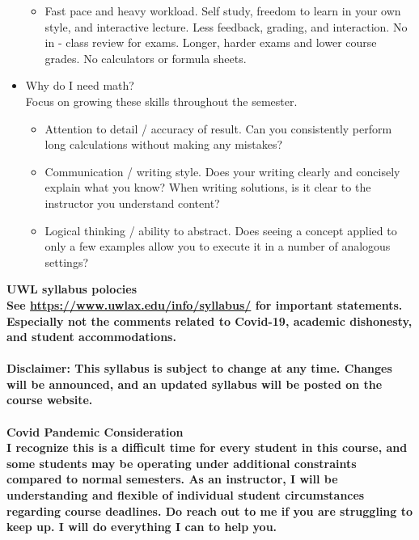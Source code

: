 \documentclass [11pt]{article}
\begin{document}
\begin{itemize}
\begin{itemize}
\setlength{\itemsep}{1pt}
\setlength{\parskip}{0pt}
\setlength{\parsep}{0pt}
\item Fast pace and heavy workload. Self study, freedom to learn in your own style, and interactive lecture. Less feedback, grading, and interaction. No in - class review for exams. Longer, harder exams and lower course grades. No calculators or formula sheets.
\end{itemize}
\item Why do I need math? \\ 
Focus on growing these skills throughout the semester.
\begin {itemize}
\setlength{\itemsep}{1pt}
\setlength{\parskip}{0pt}
\setlength{\parsep}{0pt}
\item Attention to detail / accuracy of result. Can you consistently perform long calculations without making any mistakes?
\item Communication / writing style. Does your writing clearly and concisely explain what you know? When writing solutions, is it clear to the instructor you understand content?
\item Logical thinking / ability to abstract. Does seeing a concept applied to only a few examples allow you to execute it in a number of analogous settings?
\end{itemize}
\end{itemize}
\bfseries UWL syllabus polocies \normalfont \\ 
See \url{https://www.uwlax.edu/info/syllabus/} for important statements. Especially not the comments related to Covid-19, academic dishonesty, and student accommodations. \\ \ \\
\bfseries Disclaimer: \normalfont This syllabus is subject to change at any time. Changes will be announced, and an updated syllabus will be posted on the course website. \\ \ \\
\bfseries Covid Pandemic Consideration \normalfont \\ 
I recognize this is a difficult time for every student in this course, and some students may be operating under additional constraints compared to normal semesters. As an instructor, I will be understanding and flexible of individual student circumstances regarding course deadlines. Do reach out to me if you are struggling to keep up. I will do everything I can to help you. 
\end{document}
